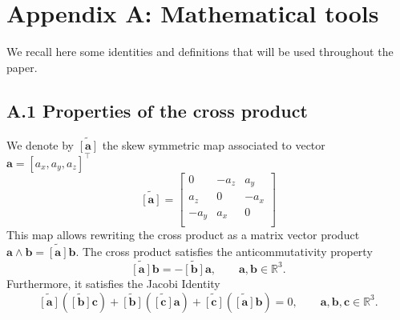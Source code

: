 \documentclass{svjour3}                     %
\newcommand{\crmat}[1]{\ensuremath{\widetilde{\left[#1\right]}}}
\begin{document}

\section*{Appendix A: Mathematical tools}
We recall here some identities and definitions that will be used throughout the paper. 
\subsection*{\normalsize \textbf{A.1 Properties of the cross product}}
We denote by $\crmat{\bm{a}}$ the skew symmetric map associated to vector $\bm{a} = [a_x, a_y, a_z]^\top$
\begin{equation}
\crmat{\bm{a}} = 
\begin{bmatrix}
0 & -a_z & a_y \\
a_z & 0 & -a_x \\
-a_y & a_x & 0 \\
\end{bmatrix}
\end{equation}
This map allows rewriting the cross product as a matrix vector product $\bm{a}\wedge \bm{b} = \crmat{\bm{a}}\bm{b}$. The cross product satisfies the anticommutativity property
\begin{equation}
\label{eq:anticom}
\crmat{\bm{a}} \bm{b} = - \crmat{\bm{b}} \bm{a}, \qquad \bm{a}, \bm{b} \in \mathbb{R}^3.
\end{equation}
Furthermore, it satisfies the Jacobi Identity
\begin{equation}
\label{eq:jacobi}
\crmat{\bm{a}} (\crmat{\bm{b}} \bm{c}) + \crmat{\bm{b}} (\crmat{\bm{c}} \bm{a}) + \crmat{\bm{c}} (\crmat{\bm{a}} \bm{b}) = 0, \qquad \bm{a}, \bm{b}, \bm{c} \in \mathbb{R}^3.
\end{equation}
\end{document}
